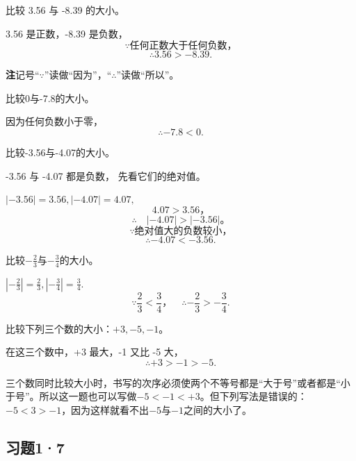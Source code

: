  比较 3.56 与 -8.39 的大小。

 3.56 是正数，-8.39 是负数，
\[
\because \text{任何正数大于任何负数，}
\]
\[
\therefore 3.56 > -8.39.
\]

\textbf{注}\quad 记号``\(\because\)''读做``因为''，``\(\therefore\)''读做``所以''。

 比较0与-7.8的大小。

 因为任何负数小于零，
\[
\therefore - 7.8 < 0.
\]

 比较-3.56与-4.07的大小。

 -3.56 与 -4.07 都是负数， 先看它们的绝对值。

\(|-3.56| = 3.56, |-4.07| = 4.07,\)
\[
4.07 > 3.56\text{，}
\]
\[
\therefore \quad | - 4.07 | > | - 3.56 |\text{。}
\]
\[
\because \text{绝对值大的负数较小，}
\]
\[
\therefore - 4.07 < - 3.56.
\]

 比较\(-\frac{2}{3}\)与\(-\frac{3}{4}\)的大小。

\(\left| -\frac{2}{3} \right| = \frac{2}{3}, \left| -\frac{3}{4} \right| = \frac{3}{4}.\)
\[
\because \frac{2}{3} < \frac{3}{4}\text{，} \quad \therefore - \frac{2}{3} > - \frac{3}{4}.
\]

 比较下列三个数的大小：\(+3, -5, -1\)。

 在这三个数中，+3 最大，-1 又比 -5 大，
\[
\therefore + 3 > - 1 > - 5.
\]

三个数同时比较大小时，书写的次序必须使两个不等号都是``大于号''或者都是``小于号''。所以这一题也可以写做\(-5 < -1 < +3\)。但下列写法是错误的：\(-5 < 3 > -1\)，因为这样就看不出\(-5\)与\(-1\)之间的大小了。

\subsection{习题1·7}

